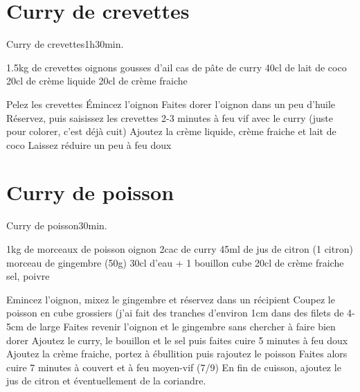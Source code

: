 {\section{Curry de crevettes}
\begin{recette}{Curry de crevettes}{1h}{30min.}{}
\begin{ingredients}
\ingredient 1.5kg de crevettes
 oignons
 gousses d'ail
 cas de pâte de curry
\ingredient 40cl de lait de coco
\ingredient 20cl de crème liquide %
\ingredient 20cl de crème fraiche
\end{ingredients}

\begin{preparation}
\etape Pelez les crevettes
\etape Émincez l'oignon
\etape Faites dorer l'oignon dans un peu d'huile
\etape Réservez, puis saisissez les crevettes 2-3 minutes à feu vif avec le curry (juste pour colorer, c'est déjà cuit)
\etape Ajoutez la crème liquide, crème fraiche et lait de coco
\etape Laissez réduire un peu à feu doux
\end{preparation}
\end{recette}

\section{Curry de poisson}
\begin{recette}{Curry de poisson}{}{30min.}{}
\begin{ingredients}
\ingredient 1kg de morceaux de poisson
 oignon
\ingredient 2cac de curry
\ingredient 45ml de jus de citron (1 citron)
 morceau de gingembre (50g)
\ingredient 30cl d'eau + 1 bouillon cube
\ingredient 20cl de crème fraiche
\ingredient sel, poivre
\end{ingredients}

\begin{preparation}
\etape Emincez l'oignon, mixez le gingembre et réservez dans un récipient
\etape Coupez le poisson en cube grossiers (j'ai fait des tranches d'environ 1cm dans des filets de 4-5cm de large
\etape Faites revenir l'oignon et le gingembre sans chercher à faire bien dorer
\etape Ajoutez le curry, le bouillon et le sel puis faites cuire 5 minutes à feu doux
\etape Ajoutez la crème fraiche, portez à ébullition puis rajoutez le poisson
\etape Faites alors cuire 7 minutes à couvert et à feu moyen-vif (7/9)
\etape En fin de cuisson, ajoutez le jus de citron et éventuellement de la coriandre. 
\end{preparation}
\end{recette}

}
